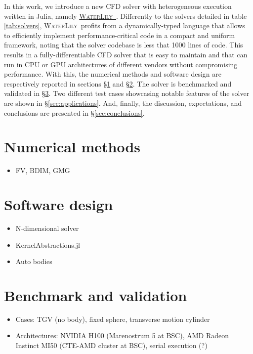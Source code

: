 \documentclass[final,3p,times]{elsarticle}
\newcommand\WaterLily[0]{\textsc{WaterLily}~}
\begin{document}
In this work, we introduce a new CFD solver with heterogeneous execution written in Julia, namely \href{https://github.com/weymouth/WaterLily.jl}{\WaterLily}. Differently to the solvers detailed in table \ref{tab:solvers}, \WaterLily profits from a dynamically-typed language that allows to efficiently implement performance-critical code in a compact and uniform framework, noting that the solver codebase is less that 1000 lines of code. This results in a fully-differentiable CFD solver that is easy to maintain and that can run in CPU or GPU architectures of different vendors without compromising performance. With this, the numerical methods and software design are respectively reported in sections \S\ref{sec:numerical_methods} and \S\ref{sec:software_design}. The solver is benchmarked and validated in \S\ref{sec:benchmark_validation}. Two different test cases showcasing notable features of the solver are shown in \S\ref{sec:applications}. And, finally, the discussion, expectations, and conclusions are presented in \S\ref{sec:conclusions}.

\section{Numerical methods}\label{sec:numerical_methods}
\begin{itemize}
  \item FV, BDIM, GMG
\end{itemize}

\section{Software design}\label{sec:software_design}
\begin{itemize}
  \item N-dimensional solver
  \item KernelAbstractions.jl
  \item Auto bodies
\end{itemize}

\section{Benchmark and validation} \label{sec:benchmark_validation}
\begin{itemize}
  \item Cases: TGV (no body), fixed sphere, transverse motion cylinder
  \item Architectures: NVIDIA H100 (Marenostrum 5 at BSC), AMD Radeon Instinct MI50 (CTE-AMD cluster at BSC), serial execution (?)
\end{itemize}
\end{document}
